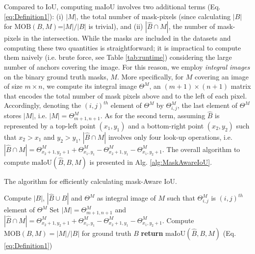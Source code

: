 \documentclass{bmvc2k}
\begin{document}
Compared to IoU, computing maIoU involves two additional terms (Eq. \ref{eq:Definition1}):  (i) $|M|$, the total number of mask-pixels (since calculating $|B|$ for $\mathrm{MOB}(B,M)$=$|M|/|B|$ is trivial), and (ii) $|\hat{B} \cap M|$, the number of mask-pixels in the intersection. While the masks are included in the datasets and computing these two quantities is straightforward; it is impractical to compute them naively (i.e. brute force, see Table \ref{tab:runtime}) considering the large number of anchors covering the image. For this reason, we employ \textit{integral images} \cite{IntegralImage} on the binary ground truth masks, $M$. More specifically, for $M$ covering an image of size $m \times n$, we compute its integral image $\Theta^M$, an $(m+1) \times (n+1)$ matrix that encodes the total number of mask pixels above and to the left of each pixel. Accordingly, denoting the $(i,j)^{th}$ element of $\Theta^M$ by $\Theta^M_{i,j}$, the last element of $\Theta^M$ stores $|M|$, i.e. $|M|=\Theta^M_{m+1,n+1}$. As for the second term, assuming $\hat{B}$ is represented by a top-left point $(x_1, y_1)$ and a bottom-right point $(x_2,y_2)$ such that $x_2>x_1$ and $y_2>y_1$, $|\hat{B} \cap M|$ involves only four look-up operations, i.e. $|\hat{B} \cap M|=\Theta^M_{x_2+1,y_2+1}+\Theta^M_{x_1,y_1}-\Theta^M_{x_2+1,y_1}-\Theta^M_{x_1,y_2+1}$. The overall algorithm to compute $\mathrm{maIoU}(\hat{B}, B, M)$ is presented in Alg. \ref{alg:MaskAwareIoU}.
\begin{algorithm}
\caption{The algorithm for efficiently calculating mask-Aware IoU. \label{alg:MaskAwareIoU}}
\small
\begin{algorithmic}[1]
\State Compute $|B|$, $|\hat{B} \cup B|$ and $\Theta^M$ as integral image of $M$ such that $\Theta^M_{i,j}$ is $(i,j)^{th}$ element of $\Theta^M$ 
\State Set $|M|=\Theta^M_{m+1,n+1}$ and $|\hat{B} \cap M|=\Theta^M_{x_2+1,y_2+1}+\Theta^M_{x_1,y_1}-\Theta^M_{x_2+1,y_1}-\Theta^M_{x_1,y_2+1}$.
\State Compute $\mathrm{MOB}(B,M)= |M|/|B|$ for ground truth $B$
\State \textbf{return} $\mathrm{maIoU} (\hat{B}, B, M)$ (Eq. \ref{eq:Definition1})
\EndProcedure
\end{algorithmic}
\end{algorithm}
\end{document}
